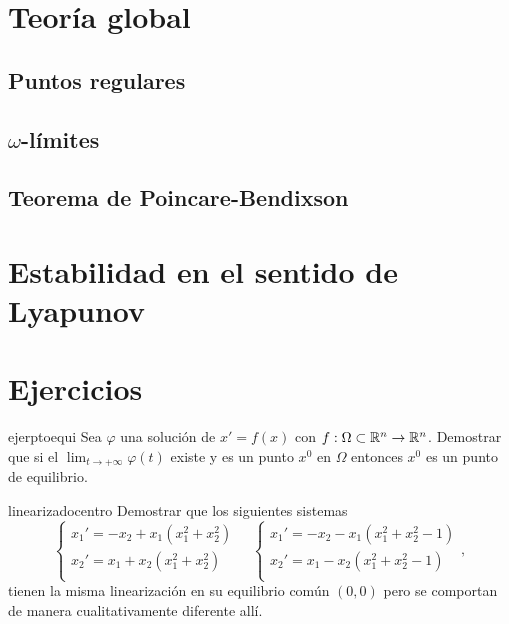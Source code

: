 \section{Teoría global}

\subsection{Puntos regulares}

\subsection{$\omega$-límites}

\subsection{Teorema de Poincare-Bendixson}

\section{Estabilidad en el sentido de Lyapunov}











\section*{Ejercicios}
\begin{ejercicio}{ejerptoequi} Sea $\varphi$ una solución de $x'=f(x)$ con
$f:\Omega\subset\rr^n\to\rr^n$. Demostrar que si el
$\lim_{t\to+\infty}\varphi(t)$ existe y es un punto $x^0$ en $\Omega$
entonces $x^0$ es un punto de equilibrio.
\end{ejercicio}

\begin{ejercicio}{linearizadocentro} Demostrar que los
siguientes sistemas
\[
    \left\{%
\begin{array}{l}
    x_1'=-x_2+x_1(x_1^2+x_2^2) \\
    x_2'=x_1+ x_2(x_1^2+x_2^2)\\
\end{array}
\right.\quad \left\{%
\begin{array}{l}
    x_1'=-x_2-x_1(x_1^2+x_2^2-1) \\
    x_2'=x_1-x_2(x_1^2+x_2^2-1)\\
\end{array} ,%
\right.
\]
tienen la  misma linearización en su equilibrio común $(0,0)$ pero
se comportan de manera cualitativamente diferente allí.
\end{ejercicio}

